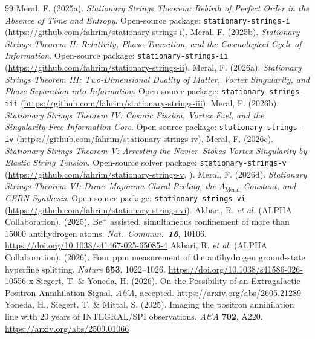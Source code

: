 \documentclass[12pt,a4paper]{article}
\begin{document}
\begin{thebibliography}{99}
     Meral, F. (2025a). \textit{Stationary Strings Theorem: Rebirth of Perfect Order in the Absence of Time and Entropy}. Open-source package: \texttt{stationary-strings-i} (\url{https://github.com/fahrim/stationary-strings-i}).
     Meral, F. (2025b). \textit{Stationary Strings Theorem II: Relativity, Phase Transition, and the Cosmological Cycle of Information}. Open-source package: \texttt{stationary-strings-ii} (\url{https://github.com/fahrim/stationary-strings-ii}).
     Meral, F. (2026a). \textit{Stationary Strings Theorem III: Two-Dimensional Duality of Matter, Vortex Singularity, and Phase Separation into Information}. Open-source package: \texttt{stationary-strings-iii} (\url{https://github.com/fahrim/stationary-strings-iii}).
     Meral, F. (2026b). \textit{Stationary Strings Theorem IV: Cosmic Fission, Vortex Fuel, and the Singularity-Free Information Core}. Open-source package: \texttt{stationary-strings-iv} (\url{https://github.com/fahrim/stationary-strings-iv}).
     Meral, F. (2026c). \textit{Stationary Strings Theorem V: Arresting the Navier--Stokes Vortex Singularity by Elastic String Tension}. Open-source solver package: \texttt{stationary-strings-v} (\url{https://github.com/fahrim/stationary-strings-v}, ).
     Meral, F. (2026d). \textit{Stationary Strings Theorem VI: Dirac--Majorana Chiral Peeling, the $\Lambda_{\mathrm{Meral}}$ Constant, and CERN Synthesis}. Open-source package: \texttt{stationary-strings-vi} (\url{https://github.com/fahrim/stationary-strings-vi}).
     Akbari, R. \textit{et al.} (ALPHA Collaboration). (2025). Be$^+$ assisted, simultaneous confinement of more than 15000 antihydrogen atoms. \textit{Nat.\ Commun.\ \textbf{16}}, 10106. \url{https://doi.org/10.1038/s41467-025-65085-4}
     Akbari, R. \textit{et al.} (ALPHA Collaboration). (2026). Four ppm measurement of the antihydrogen ground-state hyperfine splitting. \textit{Nature} \textbf{653}, 1022--1026. \url{https://doi.org/10.1038/s41586-026-10556-x}
     Siegert, T. \& Yoneda, H. (2026). On the Possibility of an Extragalactic Positron Annihilation Signal. \textit{A\&A}, accepted. \url{https://arxiv.org/abs/2605.21289}
     Yoneda, H., Siegert, T. \& Mittal, S. (2025). Imaging the positron annihilation line with 20 years of INTEGRAL/SPI observations. \textit{A\&A} \textbf{702}, A220. \url{https://arxiv.org/abs/2509.01066}

\end{thebibliography}
\end{document}
